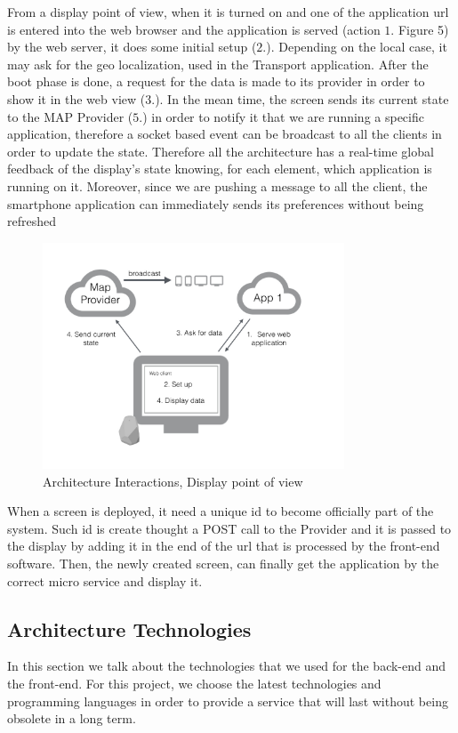 \documentclass[]{usiinfbachelorproject}
\begin{document}
From a display point of view, when it is turned on and one of the application url is entered into the web browser and the application is served (action $1.$ Figure 5) by the web server, it does some initial setup ($2.$). Depending on the local case, it may ask for the geo localization, used in the Transport application. After the boot phase is done, a request for the data is made to its provider in order to show it in the web view ($3.$).
In the mean time, the screen sends its current state to the MAP Provider ($5.$) in order to notify it that we are running a specific application, therefore a socket based event can be broadcast to all the clients in order to update the state. Therefore all the architecture has a real-time global feedback of the display's state knowing, for each element, which application is running on it.
Moreover, since we are pushing a message to all the client, the smartphone application can immediately sends its preferences without being refreshed
\begin{figure}[H]
  \centering
  \includegraphics[width=0.8\textwidth]{./images/elements_interactions_display.jpeg}
  \caption{Architecture Interactions, Display point of view}

\end{figure} 

When a screen is deployed, it need a unique id to become officially part of the system. Such id is create thought a POST call to the Provider and it is passed to the display by adding it in the end of the url that is processed by the front-end software.
Then, the newly created screen, can finally get the application by the correct micro service and display it.
\subsection{Architecture Technologies}
In this section we talk about the technologies that we used for the back-end and the front-end. For this project, we choose the latest technologies and programming languages in order to provide a service that will last without being obsolete in a long term.
\end{document}
